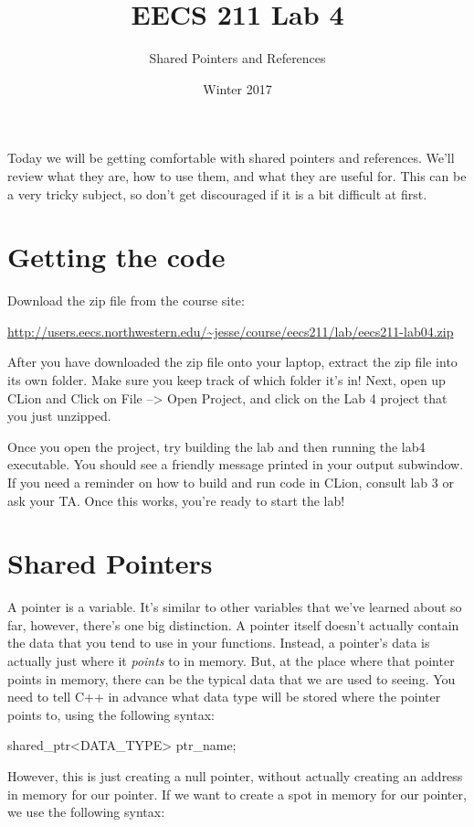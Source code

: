 \documentclass{tufte-handout}
\title{EECS 211 Lab 4}
\author{Shared Pointers and References}
\date{Winter 2017}
\begin{document}
\maketitle

Today we will be getting comfortable with shared pointers and references. We'll review what they are, how to use them, and what they are useful for.  This can be a very tricky subject, so don't get discouraged if it is a bit difficult at first.

\section{Getting the code}
Download the zip file from the course site: \medskip

\url{http://users.eecs.northwestern.edu/~jesse/course/eecs211/lab/eecs211-lab04.zip}

\medskip \noindent
After you have downloaded the zip file onto your laptop, extract the zip file into its own folder. Make sure you keep track of which folder it's in!  Next, open up CLion and Click on File --> Open Project, and click on the Lab 4 project that you just unzipped. 

Once you open the project, try building the lab and then running the lab4 executable. 
You should see a friendly message printed in your output subwindow.
If you need a reminder on how to build and run code in CLion, consult lab 3 or ask your TA.
Once this works, you're ready to start the lab!


\section{Shared Pointers}
A pointer is a variable. 
It's similar to other variables that we've learned about so far, however, there's one big distinction. 
A pointer itself doesn't actually contain the data that you tend to use in your functions.  
Instead, a pointer's data is actually just where it \textit{points} to in memory.
But, at the place where that pointer points in memory, there can be the typical data that we are used to seeing.  
You need to tell C++ in advance what data type will be stored where the pointer points to, using the following syntax:

\begin{Code}
shared_ptr<DATA_TYPE> ptr_name;
\end{Code}

\noindent
However, this is just creating a null pointer, without actually creating an address in memory for our pointer.
If we want to create a spot in memory for our pointer, we use the following syntax:
\end{document}

